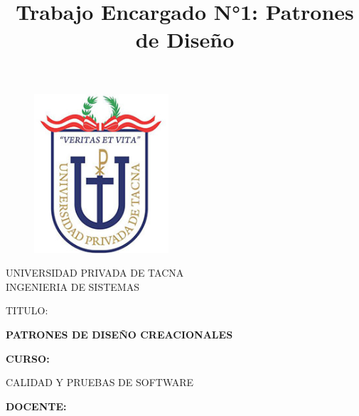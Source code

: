 \documentclass{article}
\begin{document}
\title{Trabajo Encargado N°1: Patrones de Diseño}

\begin{titlepage}
\begin{figure}[htb]
\begin{center}
\includegraphics[width=5cm]{logo.png}
\end{center}
\end{figure}
\vspace*{-0.25in}
\begin{center}
\large{UNIVERSIDAD PRIVADA DE TACNA}\\
\vspace*{-0.025in}
INGENIERIA DE SISTEMAS  \\

\vspace*{0.5in}
\begin{large}
TITULO:\\
\end{large}

\vspace*{0.1in}
\begin{Large}
\textbf{PATRONES DE DISEÑO CREACIONALES} \\
\end{Large}

\vspace*{0.3in}
\begin{Large}
\textbf{CURSO:} \\
\end{Large}

\vspace*{0.1in}
\begin{large}
CALIDAD Y PRUEBAS DE SOFTWARE\\
\end{large}

\vspace*{0.3in}
\begin{Large}
\textbf{DOCENTE:} \\
\end{Large}


\end{center}
\end{titlepage}
\end{document}
